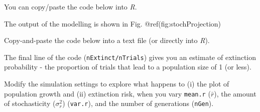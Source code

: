 \documentclass[
  a4paper]{book}
\begin{document}
You can copy/paste the code below into \emph{R}.

The output of the modelling is shown in Fig. @ref(fig:stochProjection)

\begin{do-something}
Copy-and-paste the code below into a text file (or directly into
\emph{R}).

The final line of the code (\texttt{nExtinct/nTrials}) gives you an
estimate of extinction probability - the proportion of trials that lead
to a population size of 1 (or less).

Modify the simulation settings to explore what happens to (i) the plot
of population growth and (ii) extinction risk, when you vary
\texttt{mean.r} (\(\bar{r}\)), the amount of stochasticity
(\(\sigma_r^2\)) (\texttt{var.r}), and the number of generations
(\texttt{nGen}).
\end{do-something}
\end{document}
